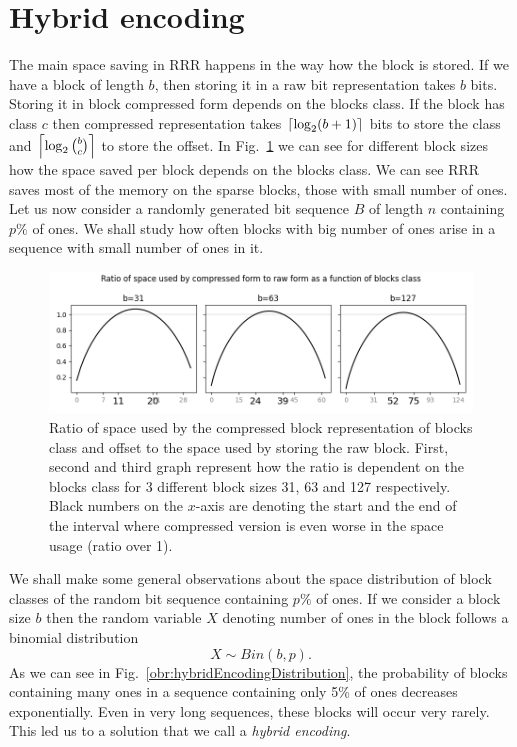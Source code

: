 \section{Hybrid encoding}


The main space saving in RRR happens in the way how the block is stored. If we have
a block of length $b$, then storing it in a raw bit representation takes $b$ bits.
Storing it in block compressed form depends on the blocks class. If the block
has class $c$ then compressed representation takes $\left\lceil \log_2 (b+1) \right\rceil$ bits to store the
class and $\left\lceil \log_2{b\choose c} \right\rceil$ to store the offset. In
Fig.~\ref{obr:rrrSpaceSavings} we can see for different block sizes how the space saved
per block depends on the blocks class. We can see RRR saves most of the memory on the
sparse blocks, those with small number of ones. Let us now consider a randomly
generated bit sequence $B$ of length $n$ containing $p\%$ of ones. We shall study how
often blocks with big number of ones arise in a sequence with small number of ones in it.

\begin{figure}
	\centerline{
		\includegraphics[width=\textwidth]{images/rrr_space_savings}
	}
	\caption[TODO]{Ratio of space used by the compressed
    block representation of blocks class and offset to the space used by storing the raw
    block. First, second and third graph represent how the ratio is dependent on the blocks
    class for 3 different block sizes 31, 63 and 127 respectively. Black numbers on the $x$-axis
    are denoting the start and the end of the interval where compressed version is even worse
    in the space usage (ratio over 1).
	}
	\label{obr:rrrSpaceSavings}
\end{figure}

We shall make some general observations about the space distribution of block
classes of the random bit sequence containing $p\%$ of ones. If we consider a
block size $b$ then the random variable $X$ denoting number of ones in the
block follows a binomial distribution $$X \sim Bin(b,p).$$ As we can see in
Fig.~\ref{obr:hybridEncodingDistribution}, the probability of blocks
containing many ones in a sequence containing only 5\% of ones
decreases exponentially. Even in very long sequences, these blocks will
occur very rarely. This led us to a solution that we call a \textit{hybrid encoding}.

